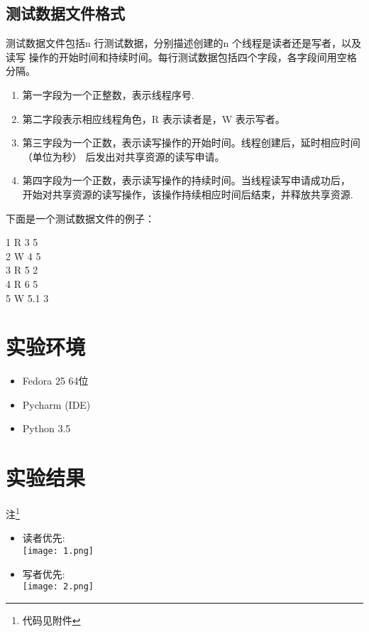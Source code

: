 \documentclass{article}
\begin{document}
\subsection{测试数据文件格式}

测试数据文件包括n 行测试数据，分别描述创建的n 个线程是读者还是写者，以及读写
操作的开始时间和持续时间。每行测试数据包括四个字段，各字段间用空格分隔。

\begin{enumerate}
\item 第一字段为一个正整数，表示线程序号.
\item 第二字段表示相应线程角色，R 表示读者是，W 表示写者。
\item 第三字段为一个正数，表示读写操作的开始时间。线程创建后，延时相应时间（单位为秒）
后发出对共享资源的读写申请。
\item 第四字段为一个正数，表示读写操作的持续时间。当线程读写申请成功后，
  开始对共享资源的读写操作，该操作持续相应时间后结束，并释放共享资源.
\end{enumerate}

下面是一个测试数据文件的例子：
\begin{center}
  1 R 3 5\\
2 W 4 5\\
3 R 5 2\\
4 R 6 5\\
5 W 5.1 3
\end{center}

\section{实验环境}
\begin{itemize}
\item Fedora 25 64位
\item Pycharm (IDE)
\item Python 3.5
\end{itemize}


\section{实验结果}

注\footnote{代码见附件}

\begin{itemize}
\item 读者优先:\\
  \texttt{[image: 1.png]}
\item 写者优先:\\
  \texttt{[image: 2.png]}
\end{itemize}
\end{document}
